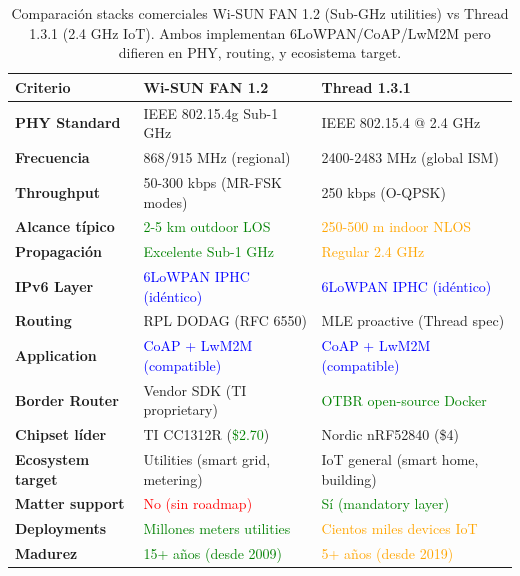 \begin{table}[h]
\centering
\small
\caption{Comparación stacks comerciales Wi-SUN FAN 1.2 (Sub-GHz utilities) vs Thread 1.3.1 (2.4 GHz IoT). Ambos implementan 6LoWPAN/CoAP/LwM2M pero difieren en PHY, routing, y ecosistema target.}
\label{tab:wisun-vs-thread-stacks}
\begin{tabular}{|p{3cm}|p{5cm}|p{5cm}|}
\hline
\rowcolor{gray!20}
\textbf{Criterio} & \textbf{Wi-SUN FAN 1.2} & \textbf{Thread 1.3.1} \\
\hline
\textbf{PHY Standard} & IEEE 802.15.4g Sub-1 GHz & IEEE 802.15.4 @ 2.4 GHz \\
\hline
\textbf{Frecuencia} & 868/915 MHz (regional) & 2400-2483 MHz (global ISM) \\
\hline
\textbf{Throughput} & 50-300 kbps (MR-FSK modes) & 250 kbps (O-QPSK) \\
\hline
\textbf{Alcance típico} & \textcolor{green}{2-5 km outdoor LOS} & \textcolor{orange}{250-500 m indoor NLOS} \\
\hline
\textbf{Propagación} & \textcolor{green}{Excelente Sub-1 GHz} & \textcolor{orange}{Regular 2.4 GHz} \\
\hline
\textbf{IPv6 Layer} & \textcolor{blue}{6LoWPAN IPHC (idéntico)} & \textcolor{blue}{6LoWPAN IPHC (idéntico)} \\
\hline
\textbf{Routing} & RPL DODAG (RFC 6550) & MLE proactive (Thread spec) \\
\hline
\textbf{Application} & \textcolor{blue}{CoAP + LwM2M (compatible)} & \textcolor{blue}{CoAP + LwM2M (compatible)} \\
\hline
\textbf{Border Router} & Vendor SDK (TI proprietary) & \textcolor{green}{OTBR open-source Docker} \\
\hline
\textbf{Chipset líder} & TI CC1312R (\textcolor{green}{\$2.70}) & Nordic nRF52840 (\$4) \\
\hline
\textbf{Ecosystem target} & Utilities (smart grid, metering) & IoT general (smart home, building) \\
\hline
\textbf{Matter support} & \textcolor{red}{No (sin roadmap)} & \textcolor{green}{Sí (mandatory layer)} \\
\hline
\textbf{Deployments} & \textcolor{green}{Millones meters utilities} & \textcolor{orange}{Cientos miles devices IoT} \\
\hline
\textbf{Madurez} & \textcolor{green}{15+ años (desde 2009)} & \textcolor{orange}{5+ años (desde 2019)} \\
\hline
\end{tabular}
\end{table}


